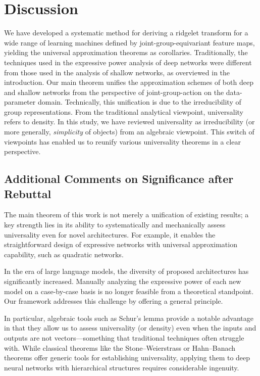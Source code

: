 \section{Discussion}
We have developed a systematic method for deriving a ridgelet transform for a wide range of learning machines defined by joint-group-equivariant feature maps, yielding the universal approximation theorems as corollaries. 
Traditionally, the techniques used in the expressive power analysis of deep networks were different from those used in the analysis of shallow networks, as overviewed in the introduction. Our main theorem unifies the approximation schemes of both deep and shallow networks from the perspective of joint-group-action on the data-parameter domain. Technically, this unification is due to the irreducibility of group representations. %
From the traditional analytical viewpoint, universality refers to density. In this study, we have reviewed universality as irreducibility (or more generally, \emph{simplicity} of objects) from an algebraic viewpoint. This switch of viewpoints has enabled us to reunify various universality theorems in a clear perspective.


\subsection*{Additional Comments on Significance after Rebuttal}

The main theorem of this work is not merely a unification of existing results; a key strength lies in its ability to systematically and mechanically assess universality even for novel architectures. For example, it enables the straightforward design of expressive networks with universal approximation capability, such as quadratic networks.

In the era of large language models, the diversity of proposed architectures has significantly increased. Manually analyzing the expressive power of each new model on a case-by-case basis is no longer feasible from a theoretical standpoint. Our framework addresses this challenge by offering a general principle.

In particular, algebraic tools such as Schur's lemma provide a notable advantage in that they allow us to assess universality (or density) even when the inputs and outputs are not vectors—something that traditional techniques often struggle with. While classical theorems like the Stone–Weierstrass or Hahn–Banach theorems offer generic tools for establishing universality, applying them to deep neural networks with hierarchical structures requires considerable ingenuity.

